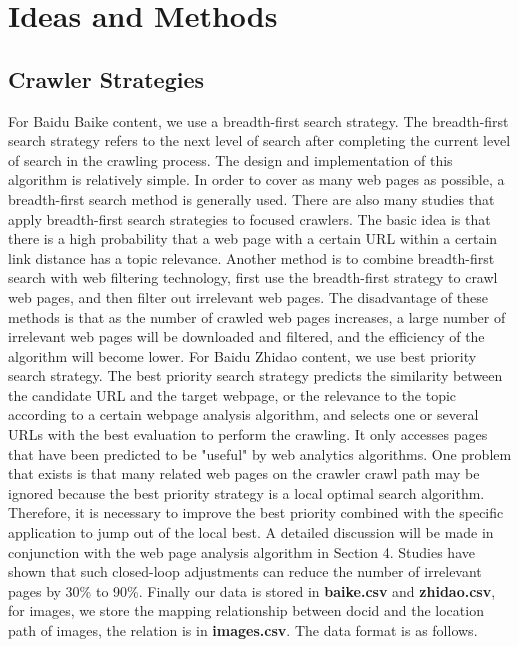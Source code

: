 \documentclass[10pt,times,twocolumn]{article}
\begin{document}
\section{Ideas and Methods}

\subsection{Crawler Strategies}
For Baidu Baike content, we use a breadth-first search strategy. The breadth-first search strategy refers to the next level of search after completing the current level of search in the crawling process. The design and implementation of this algorithm is relatively simple. In order to cover as many web pages as possible, a breadth-first search method is generally used. There are also many studies that apply breadth-first search strategies to focused crawlers. The basic idea is that there is a high probability that a web page with a certain URL within a certain link distance has a topic relevance. Another method is to combine breadth-first search with web filtering technology, first use the breadth-first strategy to crawl web pages, and then filter out irrelevant web pages. The disadvantage of these methods is that as the number of crawled web pages increases, a large number of irrelevant web pages will be downloaded and filtered, and the efficiency of the algorithm will become lower.
\newline
For Baidu Zhidao content, we use best priority search strategy. The best priority search strategy predicts the similarity between the candidate URL and the target webpage, or the relevance to the topic according to a certain webpage analysis algorithm, and selects one or several URLs with the best evaluation to perform the crawling. It only accesses pages that have been predicted to be "useful" by web analytics algorithms. One problem that exists is that many related web pages on the crawler crawl path may be ignored because the best priority strategy is a local optimal search algorithm. Therefore, it is necessary to improve the best priority combined with the specific application to jump out of the local best. A detailed discussion will be made in conjunction with the web page analysis algorithm in Section 4. Studies have shown that such closed-loop adjustments can reduce the number of irrelevant pages by 30\% to 90\%.
\newline Finally our data is stored in \textbf{baike.csv} and \textbf{zhidao.csv}, for images, we store the mapping relationship between 
docid and the location path of images, the relation is in \textbf{images.csv}. The data format is as follows.
\end{document}
